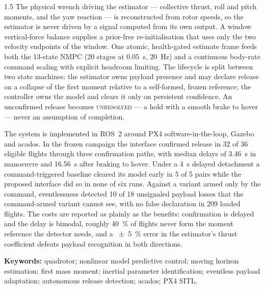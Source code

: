 \begin{spacing}{1.5}
The physical wrench driving the estimator --- collective thrust, roll and pitch
moments, and the yaw reaction --- is reconstructed from rotor speeds, so the
estimator is never driven by a signal computed from its own output. A window
vertical-force balance supplies a prior-free re-initialisation that uses only the
two velocity endpoints of the window. One atomic, health-gated estimate frame
feeds both the 13-state NMPC (20 stages at \SI{0.05}{\second}, \SI{20}{\hertz})
and a continuous body-rate command scaling with explicit headroom limiting. The
lifecycle is split between two state machines: the estimator owns payload
presence and may declare release on a collapse of the first moment relative to a
self-formed, frozen reference; the controller owns the model and clears it only
on persistent confidence. An unconfirmed release becomes \textsc{unresolved} --- a
hold with a smooth brake to hover --- never an assumption of completion.

The system is implemented in ROS~2 around PX4 software-in-the-loop, Gazebo and
acados. In the frozen campaign the interface confirmed release in 32 of 36
eligible flights through three confirmation paths, with median delays of
\SI{3.46}{\second} in manoeuvre and \SI{16.56}{\second} after braking to hover.
Under a \SI{4}{\second} delayed detachment a command-triggered baseline cleared
its model early in 5 of 5 pairs while the proposed interface did so in none of
six runs. Against a variant armed only by the command, eventlessness detected 10
of 18 unsignaled payload losses that the command-armed variant cannot see, with
no false declaration in 209 loaded flights. The costs are reported as plainly as
the benefits: confirmation is delayed and the delay is bimodal, roughly
\SI{40}{\percent} of flights never form the moment reference the detector needs,
and a \SI{\pm5}{\percent} error in the estimator's thrust coefficient defeats
payload recognition in both directions.

\textbf{Keywords:} quadrotor; nonlinear model predictive control; moving horizon
estimation; first mass moment; inertial parameter identification; eventless
payload adaptation; autonomous release detection; acados; PX4 SITL.
\end{spacing}
\newpage
